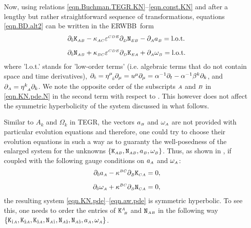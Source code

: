 \documentclass[
10pt, %
a4paper, %
oneside, %
twocolumn,
headinclude,footinclude, %
BCOR5mm, %
]{scrartcl}
\newcommand{\ERWBB}{{ERWBB}}
\newcommand{\sA}{\mathsmaller A}
\newcommand{\sB}{\mathsmaller B}
\newcommand{\sC}{\mathsmaller C}
\newcommand{\sD}{\mathsmaller D}
\newcommand{\sE}{\mathsmaller E}
\newcommand{\pd}[1]{\partial_{#1}}
\newcommand{\mg}[1]{\kappa_{#1}}			%
\newcommand{\MG}[1]{\kappa^{#1}}			%
\newcommand{\itetrsymbol}{\eta}
\newcommand{\itetr}[2]{\itetrsymbol^{#1}_{\phantom{#1}#2}}
\newcommand{\Kbuch}[2]{\mathtt{K}_{{#1}{#2}}}	%
\newcommand{\Nbuchdown}[2]{\mathtt{N}_{#1#2}}	%
\newcommand{\Kbuchmix}[2]{\mathtt{K}^{#1}_{\ #2}}	%
\newcommand{\LCtens}{\varepsilon} %
\newcommand{\indalg}[1]{\hat{\mathsmaller{#1}}}
\newcommand{\lapse}{\alpha}
\newcommand{\shift}[1]{\beta^{#1}}
\begin{document}
	
	
	
	
	Now, using relations \eqref{eqn.Buchman.TEGR.KN}--\eqref{eqn.const.KN} and
	after a lengthy but rather straightforward sequence of transformations,
	equations \eqref{eqn.BD.alt2} can be written in the \ERWBB\ form
	\begin{subequations}\label{eqn.KN.pde}
		\begin{align}
			\pd{\indalg{0}} \Kbuch{\sA}{\sB}
			&
			- \mg{\sA\sC}\LCtens^{\sC\sD\sE} \pd{\sD} \Nbuchdown{\sE}{\sB}
			- \pd{\sA} a_{\sB} = \text{l.o.t.}
			\\[2mm]
			\pd{\indalg{0}} \Nbuchdown{\sA}{\sB}
			&
			+ \mg{\sB\sC}\LCtens^{\sC\sD\sE} \pd{\sD} \Kbuch{\sE}{\sA}
			+ \pd{\sA} \omega_{\sB} = \text{l.o.t.}
			\label{eqn.KN.pde.N}
		\end{align}
	\end{subequations}
	where 'l.o.t.' stands for 'low-order terms' (i.e. algebraic terms that do
	not contain space and time derivatives), $ \pd{\indalg{0}} =
	\itetr{\mu}{\indalg{0}}\pd{\mu} = u^\mu\pd{\mu} = \lapse^{-1}\pd{t} -
	\lapse^{-1}\shift{k}\pd{k}$, and $ \pd{\sA} = \itetr{k}{\sA}\pd{k} $. 
	We note the opposite order of the subscripts $\sA$ and $\sB$ in \eqref{eqn.KN.pde.N} in the second term with respect to \cite[eq.(40)]{Buchman2003}. This however does not affect the symmetric hyperbolicity of the system discussed in what follows.
	
	
	
	Similar to $ A_k $ and $ \Omega_k $ in TEGR, the vectors $ a_{\sB} $ and $
	\omega_{\sA} $ are not provided with particular evolution equations and
	therefore, one could try to choose their evolution equations in such a way
	as to guaranty the well-posedness of the enlarged system for the unknowns $
	\{\Kbuch{\sA}{\sB},\Nbuchdown{\sA}{\sB},a_\sB,\omega_\sB \}$. Thus, as shown
	in \cite{Estabrook1997,Buchman2003}, if coupled with the following gauge conditions on $a_\sA$ and $\omega_\sA$:
	\begin{subequations}\label{eqn.aw.pde}
		\begin{align}
			\pd{\indalg{0}} a_\sA - \MG{\sB\sC}\pd{\sB} \Kbuch{\sC}{\sA} &= 0,
			\\[2mm]
			\pd{\indalg{0}} \omega_\sA + \MG{\sB\sC}\pd{\sB} \Nbuchdown{\sC}{\sA} &= 0,
		\end{align}
	\end{subequations}
	the resulting system \eqref{eqn.KN.pde}--\eqref{eqn.aw.pde} is symmetric hyperbolic. To see this, one needs to order the entries of $\Kbuchmix{\sA}{\sB}$ and $\Nbuchdown{\sA}{\sB}$ in the following way $\{\Kbuch{\indalg{1}}{\sA},\Kbuch{\indalg{2}}{\sA},\Kbuch{\indalg{3}}{\sA},\Nbuchdown{\sA}{\indalg{1}},\Nbuchdown{\sA}{\indalg{2}},\Nbuchdown{\sA}{\indalg{3}},a_\sA,\omega_\sA\}$.
	
\end{document}
